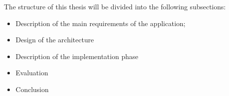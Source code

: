 The structure of this thesis will be divided into the following subsections: 

\begin{itemize}
    \item Description of the main requirements of the application;
    \item Design of the architecture 
    \item Description of the implementation phase
    \item Evaluation
    \item Conclusion
  \end{itemize}